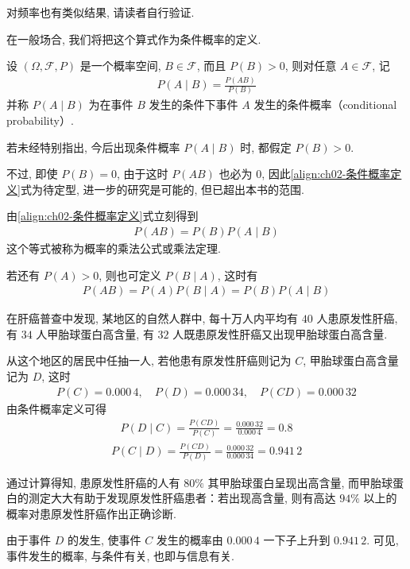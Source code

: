 \documentclass[../../main.tex]{subfiles}
\begin{document}
对频率也有类似结果, 请读者自行验证.

在一般场合, 我们将把这个算式作为条件概率的定义.

\begin{definition}[条件概率]\label{definition:ch02-条件概率}
设 $(\Omega, \mathscr{F}, P)$ 是一个概率空间, $B\in\mathscr{F}$, 而且 $P(B)>0$, 则对任意 $A\in\mathscr{F}$, 记
\begin{align}\label{align:ch02-条件概率定义}
P(A\mid B)=\frac{P(AB)}{P(B)}
\end{align}
并称 $P(A\mid B)$ 为在事件 $B$ 发生的条件下事件 $A$ 发生的条件概率（conditional probability）.
\end{definition}

若未经特别指出, 今后出现条件概率 $P(A\mid B)$ 时, 都假定 $P(B)>0$.

不过, 即使 $P(B)=0$, 由于这时 $P(AB)$ 也必为 $0$, 因此\eqref{align:ch02-条件概率定义}式为待定型, 进一步的研究是可能的, 但已超出本书的范围.

由\eqref{align:ch02-条件概率定义}式立刻得到
\begin{align}\label{align:ch02-乘法公式}
P(AB)=P(B)P(A\mid B)
\end{align}
这个等式被称为概率的乘法公式或乘法定理.

若还有 $P(A)>0$, 则也可定义 $P(B\mid A)$, 这时有
\begin{align}\label{align:ch02-乘法公式对称}
P(AB)=P(A)P(B\mid A)=P(B)P(A\mid B)
\end{align}

\begin{example}[肝癌普查]\label{example:ch02-肝癌普查}
在肝癌普查中发现, 某地区的自然人群中, 每十万人内平均有 $40$ 人患原发性肝癌, 有 $34$ 人甲胎球蛋白高含量, 有 $32$ 人既患原发性肝癌又出现甲胎球蛋白高含量.

从这个地区的居民中任抽一人, 若他患有原发性肝癌则记为 $C$, 甲胎球蛋白高含量记为 $D$, 这时
\begin{align*}
P(C)=0.000\,4,\quad P(D)=0.000\,34,\quad P(CD)=0.000\,32
\end{align*}
由条件概率定义可得
\begin{align*}
P(D\mid C)=\frac{P(CD)}{P(C)}=\frac{0.000\,32}{0.000\,4}=0.8
\end{align*}
\begin{align*}
P(C\mid D)=\frac{P(CD)}{P(D)}=\frac{0.000\,32}{0.000\,34}=0.941\,2
\end{align*}

通过计算得知, 患原发性肝癌的人有 $80\%$ 其甲胎球蛋白呈现出高含量, 而甲胎球蛋白的测定大大有助于发现原发性肝癌患者：若出现高含量, 则有高达 $94\%$ 以上的概率对患原发性肝癌作出正确诊断.

由于事件 $D$ 的发生, 使事件 $C$ 发生的概率由 $0.000\,4$ 一下子上升到 $0.941\,2$. 可见, 事件发生的概率, 与条件有关, 也即与信息有关.
\end{example}
\end{document}
